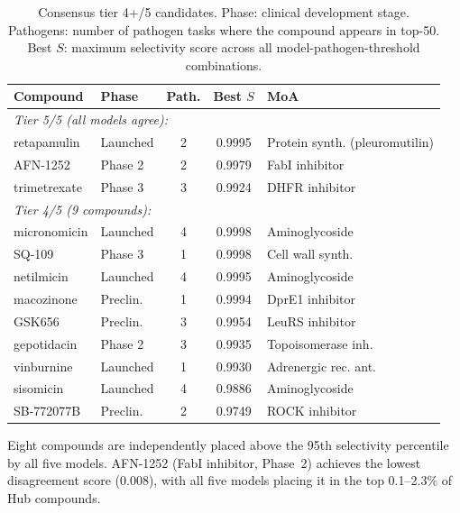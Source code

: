\documentclass{article}
\begin{document}
\begin{table}[t]
\caption{Consensus tier 4+/5 candidates. Phase: clinical development stage. Pathogens: number of pathogen tasks where the compound appears in top-50. Best $S$: maximum selectivity score across all model-pathogen-threshold combinations.}
\label{tab:consensus}
\vskip 0.1in
\centering
\scriptsize
\setlength{\tabcolsep}{2.5pt}
\begin{tabular}{llccl}
\toprule
\textbf{Compound} & \textbf{Phase} & \textbf{Path.} & \textbf{Best $S$} & \textbf{MoA} \\
\midrule
\multicolumn{5}{l}{\textit{Tier 5/5 (all models agree):}} \\
retapamulin   & Launched & 2 & 0.9995 & Protein synth. (pleuromutilin) \\
AFN-1252      & Phase 2  & 2 & 0.9979 & FabI inhibitor \\
trimetrexate  & Phase 3  & 3 & 0.9924 & DHFR inhibitor \\
\midrule
\multicolumn{5}{l}{\textit{Tier 4/5 (9 compounds):}} \\
micronomicin  & Launched & 4 & 0.9998 & Aminoglycoside \\
SQ-109        & Phase 3  & 1 & 0.9998 & Cell wall synth. \\
netilmicin    & Launched & 4 & 0.9995 & Aminoglycoside \\
macozinone    & Preclin. & 1 & 0.9994 & DprE1 inhibitor \\
GSK656        & Preclin. & 3 & 0.9954 & LeuRS inhibitor \\
gepotidacin   & Phase 2  & 3 & 0.9935 & Topoisomerase inh. \\
vinburnine    & Launched & 1 & 0.9930 & Adrenergic rec. ant. \\
sisomicin     & Launched & 4 & 0.9886 & Aminoglycoside \\
SB-772077B    & Preclin. & 2 & 0.9749 & ROCK inhibitor \\
\bottomrule
\end{tabular}
\end{table}

Eight compounds are independently placed above the 95th selectivity percentile by all five models.
AFN-1252 (FabI inhibitor, Phase~2) achieves the lowest disagreement score (0.008), with all five models placing it in the top 0.1--2.3\% of Hub compounds.

\end{document}
